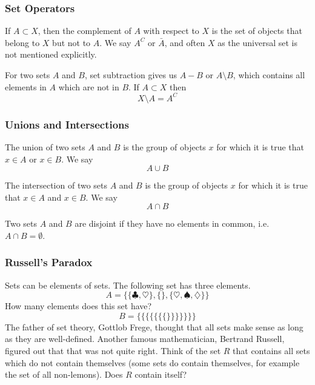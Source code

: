 \documentclass[xcolor=dvipsnames]{beamer}
\begin{document}
\begin{frame}
  \frametitle{Set Operators}
  If $A\subset{}X$, then the complement of $A$ with respect to $X$ is
  the set of objects that belong to $X$ but not to $A$. We say $A^{C}$
  or $\bar{A}$, and often $X$ as the \alert{universal set} is not
  mentioned explicitly.

  For two sets $A$ and $B$, set subtraction gives us $A-B$ or
  $A\setminus{}B$, which contains all elements in $A$ which are not in
  $B$. If $A\subset{}X$ then
  \begin{equation}
    \label{eq:sogaebae}
    X\setminus{}A=A^{C}
  \end{equation}
\end{frame}

\begin{frame}
  \frametitle{Unions and Intersections}
  The \alert{union} of two sets $A$ and $B$ is the group of objects $x$ for
  which it is true that $x\in{}A$ or $x\in{}B$. We say
  \begin{equation}
    \label{eq:atohzohb}
    A\cup{}B
  \end{equation}

  The \alert{intersection} of two sets $A$ and $B$ is the group of objects $x$ for
  which it is true that $x\in{}A$ and $x\in{}B$. We say
  \begin{equation}
    \label{eq:yeerahte}
    A\cap{}B
  \end{equation}

  Two sets $A$ and $B$ are \alert{disjoint} if they have no elements in
  common, i.e.\ $A\cap{}B=\emptyset$.
\end{frame}

\begin{frame}
  \frametitle{Russell's Paradox}
  Sets can be elements of sets. The following set has three elements.
  \begin{equation}
    \label{eq:ginoicoo}
A=\{\{\clubsuit,\heartsuit\},\{\},\{\heartsuit,\spadesuit,\diamondsuit\}\}    
  \end{equation}
  How many elements does this set have?
  \begin{equation}
    \label{eq:phuileob}
    B=\{\{\{\{\{\{\{\}\}\}\}\}\}\}
  \end{equation}
The father of set theory, Gottlob Frege, thought that all sets make
sense as long as they are well-defined. Another famous mathematician,
Bertrand Russell, figured out that that was not quite right. Think of
the set $R$ that contains all sets which do not contain themselves
(some sets do contain themselves, for example the set of all
non-lemons). Does $R$ contain itself?
\end{frame}
\end{document}
